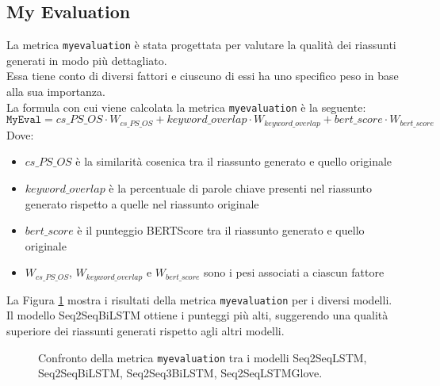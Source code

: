 \subsection{My Evaluation}
La metrica \texttt{myevaluation} \`e stata progettata per valutare la qualit\`a dei riassunti generati in modo pi\`u dettagliato.\\
Essa tiene conto di diversi fattori e ciuscuno di essi ha uno specifico peso in base alla sua importanza.\\
La formula con cui viene calcolata la metrica \texttt{myevaluation} \`e la seguente:
\[
    \texttt{MyEval} = cs\_PS\_OS \cdot W_{cs\_PS\_OS} + keyword\_overlap \cdot W_{keyword\_overlap} + bert\_score \cdot W_{bert\_score}
\]
Dove:
\begin{itemize}
    \item $cs\_PS\_OS$ \`e la similarit\`a cosenica tra il riassunto generato e quello originale
    \item $keyword\_overlap$ \`e la percentuale di parole chiave presenti nel riassunto generato rispetto a quelle nel riassunto originale
    \item $bert\_score$ \`e il punteggio BERTScore tra il riassunto generato e quello originale
    \item $W_{cs\_PS\_OS}$, $W_{keyword\_overlap}$ e $W_{bert\_score}$ sono i pesi associati a ciascun fattore
\end{itemize}

La Figura \ref{fig:myevaluation_comparison} mostra i risultati della metrica \texttt{myevaluation} per i diversi modelli.\\
Il modello Seq2SeqBiLSTM ottiene i punteggi pi\`u alti, suggerendo una qualit\`a superiore dei riassunti generati rispetto agli altri modelli.
\begin{figure}[H]
    \centering
    \hfill
    \hfill
    \hfill
    
    \caption{Confronto della metrica \texttt{myevaluation} tra i modelli Seq2SeqLSTM, Seq2SeqBiLSTM, Seq2Seq3BiLSTM, Seq2SeqLSTMGlove.}
    \label{fig:myevaluation_comparison}
\end{figure}

